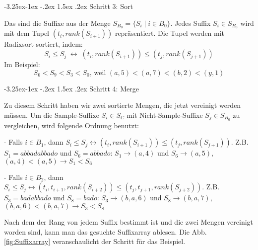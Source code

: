 \documentclass[12pt]{report}
\makeatletter
\renewcommand\paragraph{\@startsection{paragraph}{4}{\z@}%
    {-3.25ex\@plus -1ex \@minus -.2ex}%
    {1.5ex \@plus .2ex}%
    {\normalfont\normalsize\bfseries}}
\makeatother
\begin{document}
\paragraph{Schritt 3: Sort}

Das sind die Suffixe aus der Menge $S_{B_0} = \{S_i \mid i \in B_0\}$. Jedes Suffix $S_i \in S_{B_0}$ wird mit dem Tupel $(t_i,rank(S_{i+1}))$ repräsentiert. Die Tupel werden mit Radixsort sortiert, indem:
$$
S_i \le S_j \; \leftrightarrow \; (t_i,rank(S_{i+1})) \le (t_j,rank(S_{j+1}))
$$
Im Beispiel:
$$
S_6 < S_9 < S_3 < S_0 \mbox{, weil }(a,5) < (a,7) < (b,2) < (y,1)
$$

\paragraph{Schritt 4: Merge}

Zu diesem Schritt haben wir zwei sortierte Mengen, die jetzt vereinigt werden müssen. Um die Sample-Suffixe $S_i \in S_C$ mit Nicht-Sample-Suffixe $S_j \in S_{B_0}$ zu vergleichen, wird folgende Ordnung benutzt:

    - Falls $i \in B_1$, dann $S_i \le S_j \leftrightarrow (t_i,rank(S_{i+1})) \le (t_j,rank(S_{j+1}))$. Z.B. $S_1 = abbadabbado$ und $S_6 = abbado$: $S_1 \rightarrow (a,4)$ und $S_6 \rightarrow (a,5)$, $(a,4) < (a,5) \rightarrow S_1 < S_6$

    - Falls $i \in B_2$, dann $S_i \le S_j \leftrightarrow (t_i,t_{i+1},rank(S_{i+2})) \le (t_j,t_{j+1},rank(S_{j+2}))$. Z.B. $S_3 = badabbado$ und $S_8 = bado$: $S_3 \rightarrow (b,a,6)$ und $S_8 \rightarrow (b,a,7)$, $(b,a,6) < (b,a,7) \rightarrow S_3 < S_8$

Nach dem der Rang von jedem Suffix bestimmt ist und die zwei Mengen vereinigt worden sind, kann man das gesuchte Suffixarray ablesen. Die Abb. \ref{fig:Suffixarray} veranschaulicht der Schritt für das Beispiel.
\end{document}
